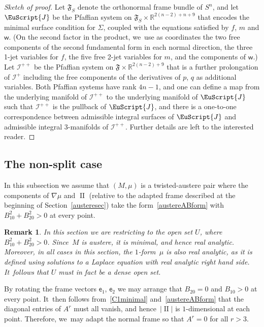 \documentclass[10pt,a4paper]{amsart}
\def\R{\mathbb{R}}
\def\ve{\mathsf{e}}
\def\vw{\mathsf{w}}
\def\II{\operatorname{II}} %
\def\F{\mathfrak{F}}
\def\calI{\mathcal{I}}
\def\J{\EuScript{J}}
\newtheorem{Remark}[Theorem]{Remark}}
\numberwithin{equation}{section}
\begin{document}
\begin{proof}[Sketch of proof]
Let $\F_S$ denote the orthonormal frame bundle of $S^n$, and let $\J$ be the Pfaffian system on $\F_S \times \R^{2(n-2) + n+9}$ that encodes the minimal surface condition for $\Sigma$, coupled with the equations satisfied by $f$, $m$ and $\vw$. (On the second factor in the product, we~use as coordinates the two free components of the second fundamental form in each normal direction, the three 1-jet variables for $f$, the five free 2-jet variables for $m$, and the components of $\vw$.) Let $\calI^{++}$ be the Pfaffian system on $\F \times \R^{2(n-2)+9}$ that is a further prolongation of $\calI^+$ including the free components of the derivatives of $p$, $q$ as additional variables. Both Pfaffian systems have rank $4n-1$, and one can define a map from the underlying manifold of $\calI^{++}$ to the underlying manifold of $\J$ such that $\calI^{++}$ is the pullback of $\J$, and there is a one-to-one correspondence between admissible integral surfaces of $\J$ and admissible integral 3-manifolds of $\calI^{++}$. Further details are left to the interested reader.
\end{proof}

\subsection{The non-split case}

In this subsection we assume that $(M,\mu)$ is a twisted-austere pair where the components of $\nabla \mu$ and $\II$ (relative to the adapted frame described at the beginning of Section~\ref{austeresec}) take the form~\eqref{austereABform} with $B_{10}^2 + B_{20}^2 > 0$ at every point.

\begin{Remark} \label{analytic-rmk}
In this section we are restricting to the open set $U$, where $B_{10}^2 + B_{20}^2 > 0$. Since~$M$ is austere, it is minimal, and hence real analytic. Moreover, in all cases in this section, the \mbox{$1$-form}~$\mu$ is also real analytic, as it is defined using solutions to a Laplace equation with real analytic right hand side. It~follows that $U$ must in fact be a \emph{dense} open set.
\end{Remark}

By rotating the frame vectors $\ve_1$, $\ve_2$ we may arrange that $B_{20}=0$ and $B_{10}>0$ at every point. It~then follows from~\eqref{C1minimal} and~\eqref{austereABform} that the diagonal entries of $A^r$ must all vanish, and hence~$|\II|$ is $1$-dimensional at each point. Therefore, we~may adapt the normal frame so that $A^r = 0$ for all $r>3$.
\end{document}
